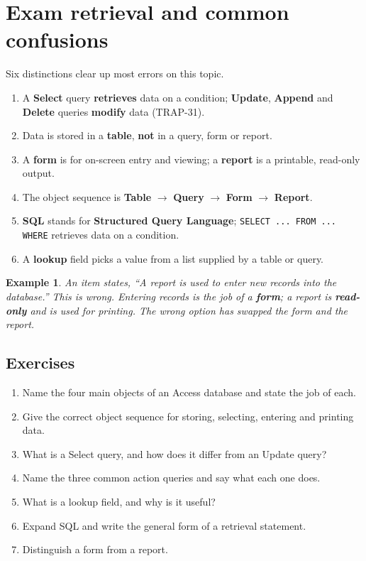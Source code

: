 \documentclass[11pt]{article}
\newtheorem{example}{Example}[section]
\begin{document}
\section{Exam retrieval and common confusions}
Six distinctions clear up most errors on this topic.
\begin{enumerate}
  \item A \textbf{Select} query \textbf{retrieves} data on a condition;
    \textbf{Update}, \textbf{Append} and \textbf{Delete} queries
    \textbf{modify} data (TRAP-31).
  \item Data is stored in a \textbf{table}, \textbf{not} in a query, form or
    report.
  \item A \textbf{form} is for on-screen entry and viewing; a \textbf{report}
    is a printable, read-only output.
  \item The object sequence is \textbf{Table} $\rightarrow$ \textbf{Query}
    $\rightarrow$ \textbf{Form} $\rightarrow$ \textbf{Report}.
  \item \textbf{SQL} stands for \textbf{Structured Query Language};
    \texttt{SELECT ... FROM ... WHERE} retrieves data on a condition.
  \item A \textbf{lookup} field picks a value from a list supplied by a table
    or query.
\end{enumerate}

\begin{example}
An item states, ``A report is used to enter new records into the
database.'' This is wrong. Entering records is the job of a \textbf{form}; a
report is \textbf{read-only} and is used for printing. The wrong option has
swapped the form and the report.
\end{example}

\subsection*{Exercises}
\begin{enumerate}[label=\arabic*.]
  \item Name the four main objects of an Access database and state the job of
    each.
  \item Give the correct object sequence for storing, selecting, entering and
    printing data.
  \item What is a Select query, and how does it differ from an Update query?
  \item Name the three common action queries and say what each one does.
  \item What is a lookup field, and why is it useful?
  \item Expand SQL and write the general form of a retrieval statement.
  \item Distinguish a form from a report.
\end{enumerate}
\end{document}
